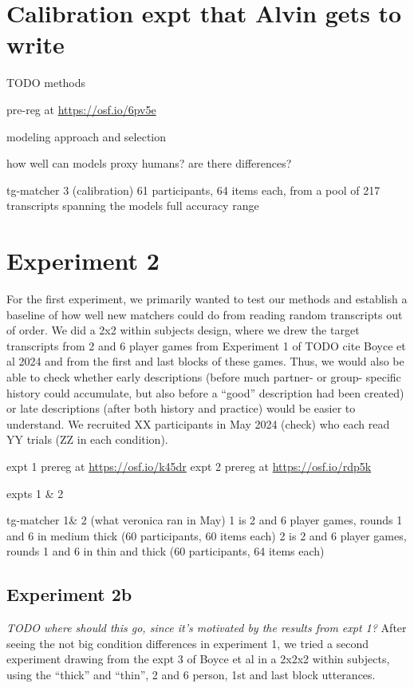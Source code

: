 \documentclass[10pt, letterpaper]{article}
\begin{document}
\section{Calibration expt that Alvin gets to
write}\label{calibration-expt-that-alvin-gets-to-write}

TODO methods

pre-reg at \url{https://osf.io/6pv5e}

modeling approach and selection

how well can models proxy humans? are there differences?

tg-matcher 3 (calibration) 61 participants, 64 items each, from a pool
of 217 transcripts spanning the models full accuracy range

\section{Experiment 2}\label{experiment-2}

For the first experiment, we primarily wanted to test our methods and
establish a baseline of how well new matchers could do from reading
random transcripts out of order. We did a 2x2 within subjects design,
where we drew the target transcripts from 2 and 6 player games from
Experiment 1 of TODO cite Boyce et al 2024 and from the first and last
blocks of these games. Thus, we would also be able to check whether
early descriptions (before much partner- or group- specific history
could accumulate, but also before a ``good'' description had been
created) or late descriptions (after both history and practice) would be
easier to understand. We recruited XX participants in May 2024 (check)
who each read YY trials (ZZ in each condition).

expt 1 prereg at \url{https://osf.io/k45dr} expt 2 prereg at
\url{https://osf.io/rdp5k}

expts 1 \& 2

tg-matcher 1\& 2 (what veronica ran in May) 1 is 2 and 6 player games,
rounds 1 and 6 in medium thick (60 participants, 60 items each) 2 is 2
and 6 player games, rounds 1 and 6 in thin and thick (60 participants,
64 items each)

\subsection{Experiment 2b}\label{experiment-2b}

\emph{TODO where should this go, since it's motivated by the results
from expt 1?} After seeing the not big condition differences in
experiment 1, we tried a second experiment drawing from the expt 3 of
Boyce et al in a 2x2x2 within subjects, using the ``thick'' and
``thin'', 2 and 6 person, 1st and last block utterances.
\end{document}
